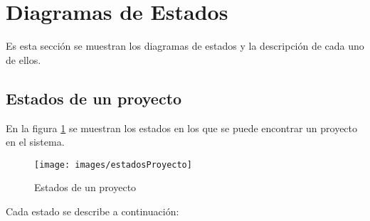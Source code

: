 \section{Diagramas de Estados}
\label{sec:diagramaEstados}

Es esta sección se muestran los diagramas de estados y la descripción de cada uno de ellos.

\subsection{Estados de un proyecto}

En la figura \ref{estadosProyecto} se muestran los \hypertarget{edoProy}{estados} en los que se puede encontrar un proyecto en el sistema.

\begin{figure}[H]
	\texttt{[image: images/estadosProyecto]}
	\caption{Estados de un proyecto}
	\label{estadosProyecto}
\end{figure}

	Cada estado se describe a continuación:

